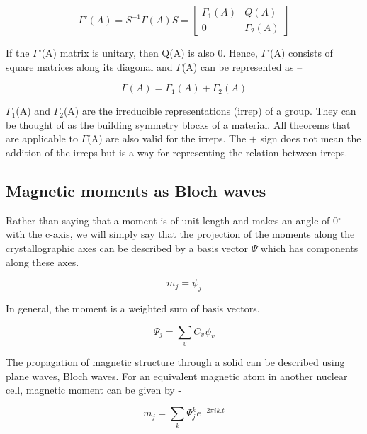 \documentclass[letterpaper,10pt,doublespacing,edeposit]{uiucthesis2020}
\begin{document}
\begin{mainmatter}
\begin{equation}
\Gamma'(A) = S^{-1}\Gamma(A)S = \begin{bmatrix} \Gamma_1(A) & Q(A) \\ 0 & \Gamma_2(A) \end{bmatrix}
\end{equation}

If the $\Gamma$'(A) matrix is unitary, then Q(A) is also 0. Hence, $\Gamma$'(A) consists of square matrices along its diagonal and $\Gamma$(A) can be represented as –

\begin{equation}
\Gamma(A) = \Gamma_1(A) + \Gamma_2(A)
\end{equation}

$\Gamma_1$(A) and $\Gamma_2$(A) are the irreducible representations (irrep) of a group. They can be thought of as the building symmetry blocks of a material. All theorems that are applicable to $\Gamma$(A) are also valid for the irreps. The $+$ sign does not mean the addition of the irreps but is a way for representing the relation between irreps.

\subsection{Magnetic moments as Bloch waves}


Rather than saying that a moment is of unit length and makes an angle of 0$^\circ$ with the c-axis, we will simply say that the projection of the moments along the crystallographic axes can be described by a basis vector $\Psi$ which has components along these axes.

\begin{equation}
m_j = \psi_j
\end{equation}

In general, the moment is a weighted sum of basis vectors.

\begin{equation}
\Psi_j = \sum_v C_v \psi_v
\end{equation}

The propagation of magnetic structure through a solid can be described using plane waves, Bloch waves. For an equivalent magnetic atom in another nuclear cell, magnetic moment can be given by -

\begin{equation}
m_j = \sum_k \Psi_j^k e^{-2\pi ik.t}
\end{equation}


\end{mainmatter}
\end{document}
